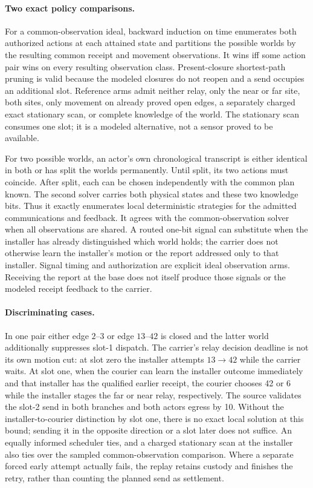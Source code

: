 \documentclass{article}
\begin{document}
\paragraph{Two exact policy comparisons.}
For a common-observation ideal, backward induction on time
enumerates both authorized actions at each attained state and
partitions the possible worlds by the resulting common receipt
and movement observations. It wins iff some action pair
wins on every resulting observation class. Present-closure
shortest-path pruning is valid because the modeled closures do
not reopen and a send occupies an additional slot. Reference
arms admit neither relay, only the near or far site, both
sites, only movement on already proved open edges, a separately
charged exact stationary scan, or complete knowledge of the world.
The stationary scan consumes one slot; it is a modeled alternative,
not a sensor proved to be available.

For two possible worlds, an actor's own chronological transcript
is either identical in both or has split the worlds permanently.
Until split, its two actions must coincide. After split, each
can be chosen independently with the common plan known.
The second solver carries both physical states and these two
knowledge bits. Thus it exactly enumerates local deterministic
strategies for the admitted communications and feedback.
It agrees with the common-observation solver when all observations
are shared. A routed one-bit signal can substitute when the
installer has already distinguished which world holds; the carrier
does not otherwise learn the installer's motion or the report
addressed only to that installer. Signal timing and authorization
are explicit ideal observation arms. Receiving the report at
the base does not itself produce those signals or the modeled
receipt feedback to the carrier.

\paragraph{Discriminating cases.}
In one pair either edge \(2\)--\(3\) or edge \(13\)--\(42\) is
closed and the latter world additionally suppresses slot-1
dispatch. The carrier's relay decision deadline is not its own
motion cut: at slot zero the installer attempts \(13\to42\)
while the carrier waits. At slot one, when the courier can learn
the installer outcome immediately and that installer has the
qualified earlier receipt, the courier chooses 42 or 6 while
the installer stages the far or near relay, respectively.
The source validates the slot-2 send in both branches and both
actors egress by 10. Without the installer-to-courier
distinction by slot one, there is no exact local solution at
this bound; sending it in the opposite direction or a slot
later does not suffice. An equally informed scheduler ties,
and a charged stationary scan at the installer also ties over
the sampled common-observation comparison. Where a separate
forced early attempt actually fails, the replay retains custody
and finishes the retry, rather than counting the planned send
as settlement.
\end{document}
